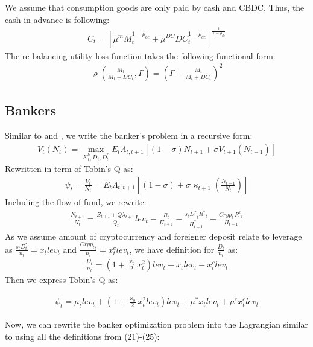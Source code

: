 \documentclass[12pt, a4paper]{article}
\begin{document}
We assume that consumption goods are only paid by cash and CBDC. Thus, the cash in advance is following:
\begin{align}
    C_t=[\mu^m M_t^{1-\rho_{dc}} + \mu^{DC}DC_t^{1-\rho_{dc}}]^{\frac{1}{1-\rho_{dc}}}
\end{align}
The re-balancing utility loss function takes the following functional form:
\begin{align}
    \varrho\left(\frac{M_t}{M_t+DC_t},\Gamma\right)= \left(\Gamma-\frac{M_t}{M_t+DC_t} \right)^2
\end{align}
\subsection{Bankers}
Similar to \cite{aoki2016monetary} and \cite{gertler2011model}, we write the banker's problem in a recursive form:
\begin{align}
V_t(N_t)= \max_{K^b_t, D_t, D^*_t} E_{t}\Lambda_{t;t+1}[ (1-\sigma)N_{t+1}+\sigma V_{t+1}(N_{t+1})]
\end{align}
Rewritten in term of Tobin's Q as:
\begin{align}
  \psi_t=  \frac{V_t}{N_t} = E_{t}\Lambda_{t;t+1}[ (1-\sigma)+\sigma \varkappa_{t+1}\left(\frac{N_{t+1}}{N_{t}}\right)]
\end{align}
Including the flow of fund, we rewrite:
\begin{align}
    \frac{N_{t+1}}{N_{t}}= \frac{Z_{t+1}+Q\lambda_{t+1}}{Q_t}lev_t-\frac{{R}_{t}}{{\Pi}_{t+1}}-\frac{{s_t D^{*}}_{t}{R^{*}}_{t}}{\Pi^*_{t+1}} -\frac{ {Cryp}_{t}\, {R^c}_{t}}{{\Pi}_{t+1}}
\end{align}
As we assume amount of cryptocurrency and foreigner deposit relate to leverage as $\frac{s_t D^{*}_{t}}{n_{t}}=x_t lev_t$ and  $\frac{{ Cryp_t}_{t}}{n_{t}}=x^c_t lev_t$, we have definition for $\frac{ D_{t}}{n_{t}}$ as:
\begin{align}
    \frac{D_{t}}{n_{t}} =  \left(1+\frac{\varkappa_{b}}{2} x^2_t\right) lev_t - x_t lev_t  -x^c_t lev_t
\end{align}
Then we express Tobin's Q as:

\begin{align}
 \psi_t=  \mu_t lev_t + \left(1+\frac{\varkappa_{b}}{2} x^2_t lev_t \right) lev_t +\mu^* x_t lev_t +\mu^c x^c_t lev_t
\end{align} 

Now, we can rewrite the banker optimization problem into the Lagrangian similar to \cite{aoki2016monetary} using all the definitions from (21)-(25):
\end{document}
